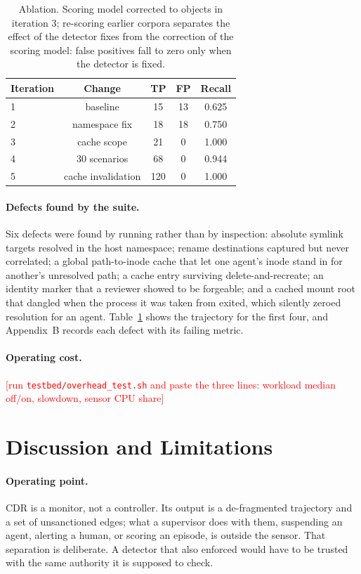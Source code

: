 \documentclass[11pt]{article}
\newcommand{\placeholder}[1]{\textcolor{red}{[#1]}}
\begin{document}
\begin{table}[t]
\centering
\small
\begin{tabular}{@{}lcccc@{}}
\toprule
Iteration & Change & TP & FP & Recall \\
\midrule
1 & baseline            & 15  & 13 & 0.625 \\
2 & namespace fix       & 18  & 18 & 0.750 \\
3 & cache scope         & 21  & 0  & 1.000 \\
4 & 30 scenarios        & 68  & 0  & 0.944 \\
5 & cache invalidation  & 120 & 0  & 1.000 \\
\bottomrule
\end{tabular}
\caption{Ablation. Scoring model corrected to objects in iteration 3; re-scoring earlier corpora separates the effect of the detector
fixes from the correction of the scoring model: false positives fall to zero only
when the detector is fixed.}
\label{tab:ablation}
\end{table}

\paragraph{Defects found by the suite.} Six defects were found by running rather
than by inspection: absolute symlink targets resolved in the host namespace;
rename destinations captured but never correlated; a global path-to-inode cache
that let one agent's inode stand in for another's unresolved path; a cache entry
surviving delete-and-recreate; an identity marker that a reviewer showed to be
forgeable; and a cached mount root that dangled when the process it was taken from
exited, which silently zeroed resolution for an agent. Table~\ref{tab:ablation}
shows the trajectory for the first four, and Appendix~B records each defect with
its failing metric.

\paragraph{Operating cost.} \placeholder{run \texttt{testbed/overhead\_test.sh} and paste
the three lines: workload median off/on, slowdown, sensor CPU share}

\section{Discussion and Limitations}
\label{sec:limits}

\paragraph{Operating point.} CDR is a monitor, not a controller. Its output is a
de-fragmented trajectory and a set of unsanctioned edges; what a supervisor does
with them, suspending an agent, alerting a human, or scoring an episode, is
outside the sensor. That separation is deliberate. A detector that also enforced
would have to be trusted with the same authority it is supposed to check.
\end{document}
